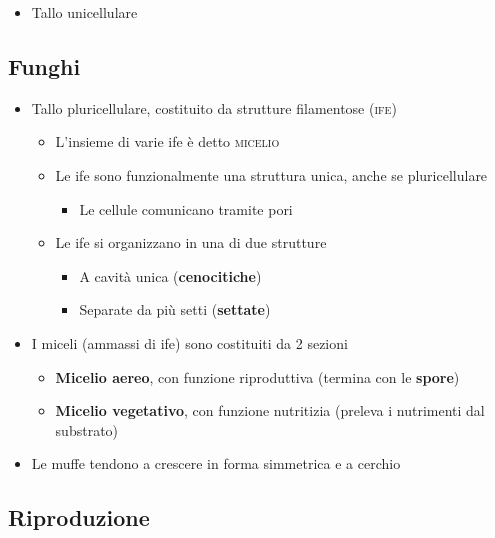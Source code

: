 \documentclass[italian,]{article}
\providecommand{\tightlist}{%
  \setlength{\itemsep}{0pt}\setlength{\parskip}{0pt}}
\begin{document}
\begin{itemize}
\tightlist
\item
  Tallo unicellulare
\end{itemize}

\hypertarget{funghi}{%
\subsection{Funghi}\label{funghi}}

\begin{itemize}
\tightlist
\item
  Tallo pluricellulare, costituito da strutture filamentose
  (\textsc{ife})

  \begin{itemize}
  \tightlist
  \item
    L'insieme di varie ife è detto \textsc{micelio}
  \item
    Le ife sono funzionalmente una struttura unica, anche se
    pluricellulare

    \begin{itemize}
    \tightlist
    \item
      Le cellule comunicano tramite pori
    \end{itemize}
  \item
    Le ife si organizzano in una di due strutture

    \begin{itemize}
    \tightlist
    \item
      A cavità unica (\textbf{cenocitiche})
    \item
      Separate da più setti (\textbf{settate})
    \end{itemize}
  \end{itemize}
\item
  I miceli (ammassi di ife) sono costituiti da 2 sezioni

  \begin{itemize}
  \tightlist
  \item
    \textbf{Micelio aereo}, con funzione riproduttiva (termina con le
    \textbf{spore})
  \item
    \textbf{Micelio vegetativo}, con funzione nutritizia (preleva i
    nutrimenti dal substrato)
  \end{itemize}
\item
  Le muffe tendono a crescere in forma simmetrica e a cerchio
\end{itemize}

\hypertarget{riproduzione-1}{%
\subsection{Riproduzione}\label{riproduzione-1}}
\end{document}
